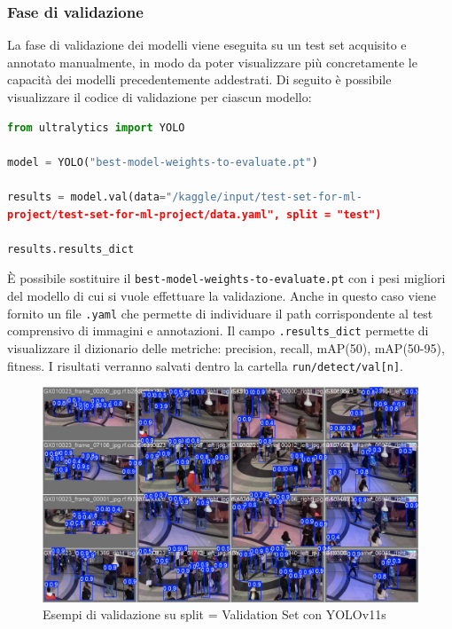\documentclass[12pt]{article}
\begin{document}
\subsubsection{Fase di validazione}
La fase di validazione dei modelli viene eseguita su un test set acquisito e annotato manualmente, in modo da poter visualizzare più concretamente le capacità dei modelli precedentemente addestrati. Di seguito è possibile visualizzare il codice di validazione per ciascun modello:

\begin{lstlisting}[language=Python, caption={Esempio di codice per la validazione dei modelli YOLO}, label={lst:val-yolo}]
from ultralytics import YOLO

model = YOLO("best-model-weights-to-evaluate.pt") 

results = model.val(data="/kaggle/input/test-set-for-ml-
project/test-set-for-ml-project/data.yaml", split = "test")

results.results_dict
\end{lstlisting}
È possibile sostituire il \texttt{best-model-weights-to-evaluate.pt} con i pesi migliori del modello di cui si vuole effettuare la validazione. Anche in questo caso viene fornito un file \texttt{.yaml} che permette di individuare il path corrispondente al test comprensivo di immagini e annotazioni. Il campo \texttt{.results\_dict} permette di visualizzare il dizionario delle metriche: precision, recall, mAP(50), mAP(50-95), fitness. I risultati verranno salvati dentro la cartella \texttt{run/detect/val[n]}.

\begin{figure}[H]
    \centering
    \includegraphics[width=1.00\textwidth]{./img/val_batch0_pred-yolov11s.jpg}
    \caption{Esempi di validazione su split = Validation Set con YOLOv11s}
    \label{fig:yolov11s-validation-set}
\end{figure}
\end{document}
